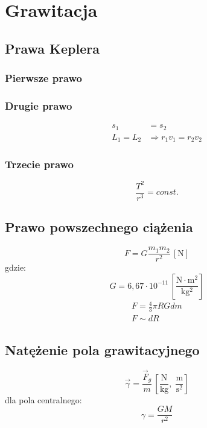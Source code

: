 \documentclass{article}
\numberwithin{equation}{section}
\newcommand{\unit}[1]{\, \left[\mathrm{#1}\right]}
\begin{document}
  \newpage
  \section{Grawitacja}
    \subsection{Prawa Keplera}
      \subsubsection{Pierwsze prawo}
      \subsubsection{Drugie prawo}
        \begin{align}
          s_1 &= s_2\\
          L_1 = L_2 &\Rightarrow r_1v_1 = r_2v_2
        \end{align}
      \subsubsection{Trzecie prawo}
        \begin{equation}
          \frac{T^2}{r^3} = const.
        \end{equation}
    \subsection{Prawo powszechnego ciążenia}
      \begin{equation}
        F = G\frac{m_1m_2}{r^2} \unit{N}
      \end{equation}
      gdzie:
      \begin{equation}
        G = 6,67\cdot 10^{-11} \unit{\frac{N\cdot m^2}{kg^2}}
      \end{equation}
      \begin{gather}
        F = \frac{4}{3}\pi RGdm\\
        F \sim dR
      \end{gather}
    \subsection{Natężenie pola grawitacyjnego}
      \begin{equation}
        \vec\gamma = \frac{\vec F_g}{m} \unit{\frac{N}{kg},\;\frac{m}{s^2}}
      \end{equation}
      dla pola centralnego:
      \begin{equation}
        \gamma = \frac{GM}{r^2}
      \end{equation}
\end{document}
